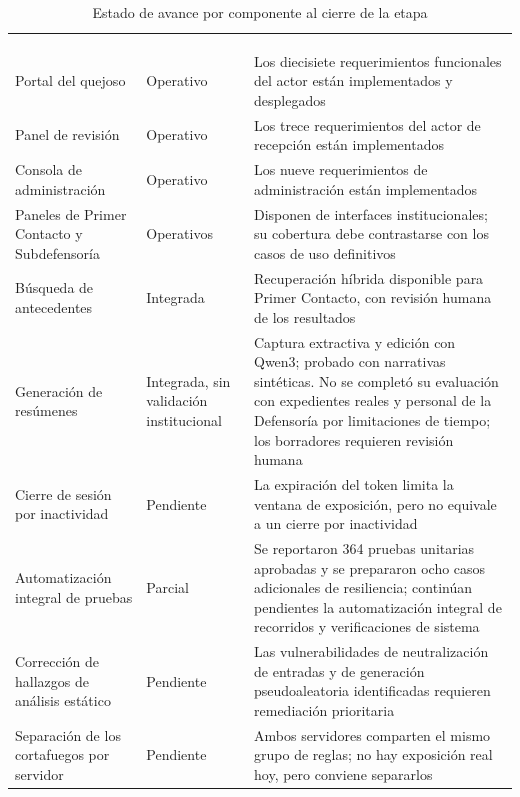 \begin{longtable}{|p{3.7cm}|p{2.1cm}|p{8.2cm}|}
	\hiderowcolors\caption{Estado de avance por componente al cierre de la etapa}
	\label{tab:estado_avance} \\ \showrowcolors
	\hline
	\rowcolor{headerblue}
	\headercell{Componente} & \headercell{Estado} & \headercell{Observaciones} \\
	\hline
	\endfirsthead

	\hline
	\rowcolor{headerblue}
	\headercell{Componente} & \headercell{Estado} & \headercell{Observaciones} \\
	\hline
	\endhead

	Portal del quejoso & Operativo & Los diecisiete requerimientos funcionales del actor están
	implementados y desplegados \\ \hline

	Panel de revisión & Operativo & Los trece requerimientos del actor de recepción están
	implementados \\ \hline

	Consola de administración & Operativo & Los nueve requerimientos de administración están
	implementados \\ \hline

	Paneles de Primer Contacto y Subdefensoría & Operativos & Disponen de interfaces institucionales; su cobertura debe contrastarse con los casos de uso definitivos \\ \hline

	Búsqueda de antecedentes & Integrada & Recuperación híbrida disponible para Primer Contacto, con revisión humana de los resultados \\ \hline

	Generación de resúmenes & Integrada, sin validación institucional & Captura extractiva y edición con Qwen3; probado con narrativas sintéticas. No se completó su evaluación con expedientes reales y personal de la Defensoría por limitaciones de tiempo; los borradores requieren revisión humana \\ \hline

	Cierre de sesión por inactividad & Pendiente & La expiración del token limita la ventana de
	exposición, pero no equivale a un cierre por inactividad \\ \hline

	Automatización integral de pruebas & Parcial & Se reportaron 364 pruebas unitarias aprobadas y se prepararon ocho casos adicionales de resiliencia; continúan pendientes la automatización integral de recorridos y verificaciones de sistema \\ \hline

	Corrección de hallazgos de análisis estático & Pendiente & Las vulnerabilidades de
	neutralización de entradas y de generación pseudoaleatoria identificadas requieren remediación
	prioritaria \\ \hline

	Separación de los cortafuegos por servidor & Pendiente & Ambos servidores comparten el mismo
	grupo de reglas; no hay exposición real hoy, pero conviene separarlos \\ \hline
\end{longtable}

\normalsize
\setlength{\tabcolsep}{6pt}
\renewcommand{\arraystretch}{1}
